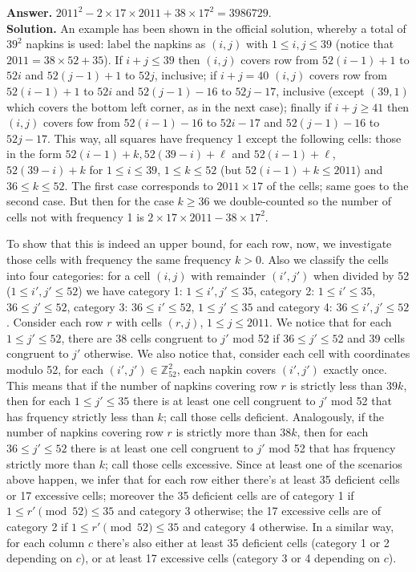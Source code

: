 \documentclass[11pt,a4paper]{article}
\begin{document}
\begin{enumerate}
	\textbf{Answer.} $2011^2-2\times 17\times 2011 + 38 \times 17^2 = 3986729$. \\
	\textbf{Solution.} An example has been shown in the official solution, whereby a total of $39^2$ napkins is used: label the napkins as $(i, j)$ with $1\le i, j\le 39$ (notice that $2011=38\times 52+35$). If $i+j\le 39$ then $(i, j)$ covers row from $52(i-1)+1$ to $52i$ and $52(j-1)+1$ to $52j$, inclusive; 
	if $i+j=40$ $(i, j)$ covers row from $52(i-1)+1$ to $52i$ and $52(j-1)-16$ to $52j-17$, inclusive (except $(39, 1)$ which covers the bottom left corner, as in the next case); finally if $i+j\ge 41$ then $(i, j)$ covers fow from $52(i-1)-16$ to $52i-17$ and $52(j-1)-16$ to $52j-17$. 
	This way, all squares have frequency 1 except the following cells: those in the form $52(i-1)+k, 52(39-i)+\ell$ and $52(i-1)+\ell$, $52(39-i)+k$ for $1\le i\le 39$, $1\le k\le 52$ (but $52(i-1)+k\le 2011$) and $36\le k\le 52$. 
	The first case corresponds to $2011\times 17$ of the cells; same goes to the second case. But then for the case $k\ge 36$ we double-counted so the number of cells not with frequency 1 is $2\times 17\times 2011-38\times 17^2$. 
	
	To show that this is indeed an upper bound, for each row, now, we investigate those cells with frequency the same frequency $k>0$. Also we classify the cells into four categories: for a cell $(i, j)$ with remainder $(i', j')$ when divided by 52 ($1\le i', j'\le 52$) we have category 1: $1\le i', j'\le 35$, category 2: $1\le i'\le 35$, $36\le j'\le 52$, category 3: $36\le i'\le 52$, $1\le j'\le 35$ and category 4: $36\le i', j'\le 52$. 
	Consider each row $r$ with cells $(r, j)$, $1\le j\le 2011$. 
	We notice that for each $1\le j'\le 52$, there are 38 cells congruent to $j'$ mod 52 if $36\le j'\le 52$ and 39 cells congruent to $j'$ otherwise. 
	We also notice that, consider each cell with coordinates modulo 52, for each $(i', j')\in \mathbb{Z}_{52}^2$, each napkin covers $(i', j')$ exactly once. 
	This means that if the number of napkins covering row $r$ is strictly less than $39k$, then for each $1\le j' \le 35$ there is at least one cell congruent to $j'$ mod 52 that has frquency strictly less than $k$; call those cells deficient. 
	Analogously, if the number of napkins covering row $r$ is strictly more than $38k$, then for each $36\le j' \le 52$ there is at least one cell congruent to $j'$ mod 52 that has frquency strictly more than $k$; call those cells excessive. 
	Since at least one of the scenarios above happen, we infer that for each row either there's at least 35 deficient cells or 17 excessive cells; moreover the 35 deficient cells are of category 1 if $1\le r'\pmod{52}\le 35$ and category 3 otherwise; the 17 excessive cells are of category 2 if $1\le r'\pmod{52}\le 35$ and category 4 otherwise. 
	In a similar way, for each column $c$ there's also either at least 35 deficient cells (category 1 or 2 depending on $c$), or at least 17 excessive cells (category 3 or 4 depending on $c$). 
	

\end{enumerate}
\end{document}

